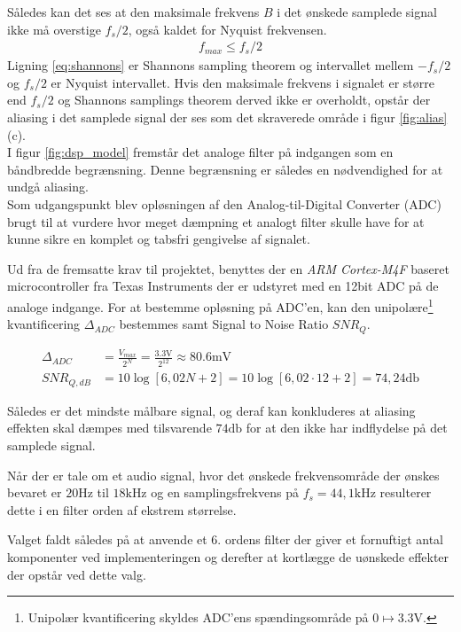 Således kan det ses at den maksimale frekvens $B$ i det ønskede samplede signal ikke må overstige $f_s/2$, også kaldet for Nyquist frekvensen.
\begin{align}
	f_{max} \leq f_s/2 \label{eq:shannons}
\end{align}
Ligning \ref{eq:shannons} er Shannons sampling theorem og intervallet mellem $-f_s/2$ og $f_s/2$ er Nyquist intervallet.
Hvis den maksimale frekvens i signalet er større end $f_s/2$ og Shannons samplings theorem derved ikke er overholdt, opstår der aliasing i det samplede signal der ses som det skraverede område i figur \ref{fig:alias}(c).
\\
I figur \ref{fig:dsp_model} fremstår det analoge filter på indgangen som en båndbredde begrænsning.
Denne begrænsning er således en nødvendighed for at undgå aliasing. 
\\
Som udgangspunkt blev opløsningen af den Analog-til-Digital Converter (ADC) brugt til at vurdere hvor meget dæmpning et analogt filter skulle have for at kunne sikre en komplet og tabsfri gengivelse af signalet.

Ud fra de fremsatte krav til projektet, benyttes der en \emph{ARM Cortex-M4F} baseret microcontroller fra Texas Instruments \cite{spmu296} der er udstyret med en 12bit ADC på de analoge indgange.
For at bestemme opløsning på ADC'en, kan den unipolære\footnote{Unipolær kvantificering skyldes ADC'ens spændingsområde på $0 \longmapsto \num{3.3}\si{\volt}$.} kvantificering $\Delta_{ADC}$ bestemmes samt Signal to Noise Ratio $SNR_Q$.
   
\begin{align}
	\Delta_{ADC} &= \frac{V_{max}}{2^N} = \frac{\num{3.3}\si{\volt}}{2^{12}} \approx \num{80.6}\si{\milli\volt}\\
	SNR_{Q,dB} &= 10 \log \left[6,02 N + 2 \right] = 10 \log \left[6,02\cdot 12+2\right] = 74,24 \si{\decibel} 
\end{align}
 
Således er det mindste målbare signal, og deraf kan konkluderes at aliasing effekten skal dæmpes med tilsvarende $74\si{\decibel}$ for at den ikke har indflydelse på det samplede signal.

Når der er tale om et audio signal, hvor det ønskede frekvensområde der ønskes bevaret er $20\si{\hertz}$ til $18\si{\kilo\hertz}$ og en samplingsfrekvens på $f_s = 44,1\si{\kilo\hertz}$ resulterer dette i en filter orden af ekstrem størrelse.

Valget faldt således på at anvende et 6. ordens filter der giver et fornuftigt antal komponenter ved implementeringen og derefter at kortlægge de uønskede effekter der opstår ved dette valg. 
 

